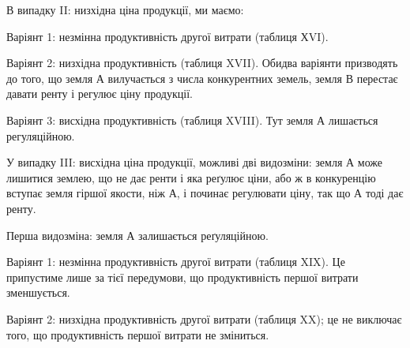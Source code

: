 В випадку II: низхідна ціна продукції, ми маємо:

Варіянт 1: незмінна продуктивність другої витрати (таблиця ХVI).

Варіянт 2: низхідна продуктивність (таблиця XVII). Обидва варіянти призводять
до того, що земля А вилучається з числа конкурентних земель, земля
В перестає давати ренту і регулює ціну продукції.

Варіянт 3: висхідна продуктивність (таблиця XVIII). Тут земля А лишається
регуляційною.

У випадку III: висхідна ціна продукції, можливі дві видозміни: земля
А може лишитися землею, що не дає ренти і яка реґулює ціни, або ж в конкуренцію
вступає земля гіршої якости, ніж А, і починає регулювати ціну, так що А
тоді дає ренту.

Перша видозміна: земля А залишається реґуляційною.

Варіянт 1: незмінна продуктивність другої витрати (таблиця XIX). Це припустиме
лише за тієї передумови, що продуктивність першої витрати
зменшується.

Варіянт 2: низхідна продуктивність другої витрати (таблиця XX); це не виключає
того, що продуктивність першої витрати не зміниться.
